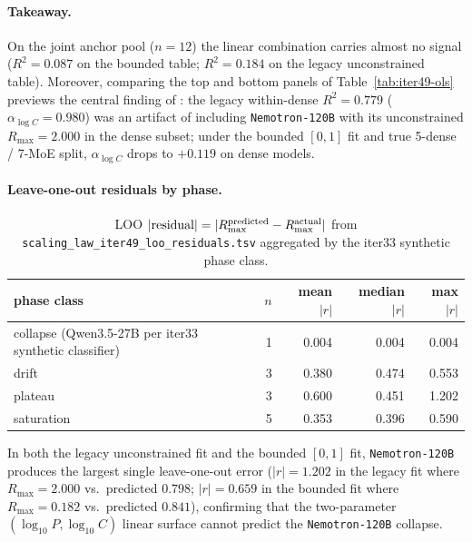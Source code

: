 \paragraph{Takeaway.}
On the joint anchor pool ($n=12$) the linear combination carries almost no signal ($R^2=0.087$ on the bounded table; $R^2=0.184$ on the legacy unconstrained table). Moreover, comparing the top and bottom panels of Table~\ref{tab:iter49-ols} previews the central finding of : the legacy within-dense $R^2=0.779$ ($\alpha_{\log C}=0.980$) was an artifact of including \texttt{Nemotron-120B} with its unconstrained $R_{\max}=2.000$ in the dense subset; under the bounded $[0,1]$ fit and true 5-dense / 7-MoE split, $\alpha_{\log C}$ drops to $+0.119$ on dense models.

\paragraph{Leave-one-out residuals by phase.}
\begin{table}[ht]
\centering\small
\begin{tabular}{lrrrr}
\toprule
phase class & $n$ & mean $|r|$ & median $|r|$ & max $|r|$ \\
\midrule
 collapse (Qwen3.5-27B per iter33 synthetic classifier) & 1 & 0.004 & 0.004 & 0.004 \\
 drift  & 3 & 0.380 & 0.474 & 0.553 \\
 plateau & 3 & 0.600 & 0.451 & 1.202 \\
 saturation & 5 & 0.353 & 0.396 & 0.590 \\
\bottomrule
\end{tabular}
\caption{LOO $|\mathrm{residual}|=|R_{\max}^{\rm predicted}-R_{\max}^{\rm actual}|$ from \texttt{scaling\_law\_iter49\_loo\_residuals.tsv} aggregated by the iter33 synthetic phase class.}
\label{tab:iter49-loo}
\end{table}

In both the legacy unconstrained fit and the bounded $[0,1]$ fit, \texttt{Nemotron-120B} produces the largest single leave-one-out error ($|r|=1.202$ in the legacy fit where $R_{\max}=2.000$ vs.\ predicted $0.798$; $|r|=0.659$ in the bounded fit where $R_{\max}=0.182$ vs.\ predicted $0.841$), confirming that the two-parameter $(\log_{10} P, \log_{10} C)$ linear surface cannot predict the \texttt{Nemotron-120B} collapse.

